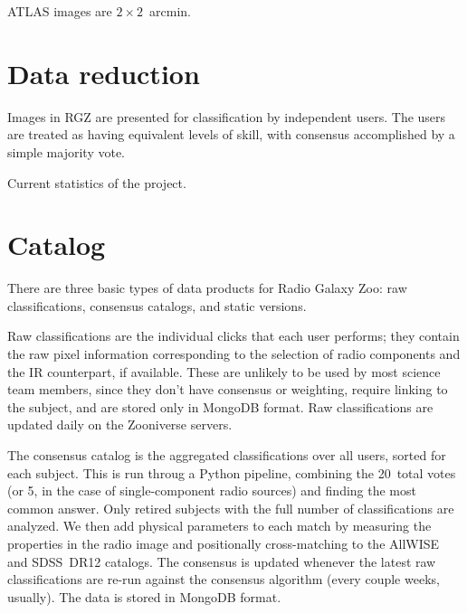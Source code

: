 \documentclass[a4,useAMS,usenatbib]{mn2e}
\begin{document}
ATLAS images are $2\times2$~arcmin. 

\section{Data reduction}\label{sec:data_reduction}

Images in RGZ are presented for classification by independent users. The users are treated as having equivalent levels of skill, with consensus accomplished by a simple majority vote. 

Current statistics of the project.

\section{Catalog}\label{sec:catalog}

There are three basic types of data products for Radio Galaxy Zoo: raw classifications, consensus catalogs, and static versions. 
 
Raw classifications are the individual clicks that each user performs; they contain the raw pixel information corresponding to the selection of radio components and the IR counterpart, if available. These are unlikely to be used by most science team members, since they don't have consensus or weighting, require linking to the subject, and are stored only in MongoDB format. Raw classifications are updated daily on the Zooniverse servers. 
 
The consensus catalog is the aggregated classifications over all users, sorted for each subject. This is run throug a Python pipeline, combining the 20~total votes (or 5, in the case of single-component radio sources) and finding the most common answer. Only retired subjects with the full number of classifications are analyzed. We then add physical parameters to each match by measuring the properties in the radio image and positionally cross-matching to the AllWISE \citep{cut13} and SDSS~DR12 \citep{ala15} catalogs. The consensus is updated whenever the latest raw classifications are re-run against the consensus algorithm (every couple weeks, usually). The data is stored in MongoDB format. 
 
\end{document}
